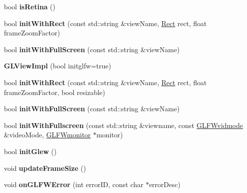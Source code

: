 \begin{DoxyCompactItemize}
\item 
\mbox{\label{classGLViewImpl_aed0c3ba5fb9fbd5c67a2e42cdb828468}} 
bool {\bfseries is\+Retina} ()
\item 
\mbox{\label{classGLViewImpl_ad6cafe42af330824321180c50d5982c1}} 
bool {\bfseries init\+With\+Rect} (const std\+::string \&view\+Name, \hyperlink{classRect}{Rect} rect, float frame\+Zoom\+Factor)
\item 
\mbox{\label{classGLViewImpl_a2815df489e15eeb1e75d96398ff71c9c}} 
bool {\bfseries init\+With\+Full\+Screen} (const std\+::string \&view\+Name)
\item 
\mbox{\label{classGLViewImpl_a992936557b65a1ab4d3b47253ad5253b}} 
{\bfseries G\+L\+View\+Impl} (bool initglfw=true)
\item 
\mbox{\label{classGLViewImpl_ac70725a8b0fca28f099c73326ed6b701}} 
bool {\bfseries init\+With\+Rect} (const std\+::string \&view\+Name, \hyperlink{classRect}{Rect} rect, float frame\+Zoom\+Factor, bool resizable)
\item 
\mbox{\label{classGLViewImpl_a2815df489e15eeb1e75d96398ff71c9c}} 
bool {\bfseries init\+With\+Full\+Screen} (const std\+::string \&view\+Name)
\item 
\mbox{\label{classGLViewImpl_a36797ac9459603a20e54f0aa3b7ae649}} 
bool {\bfseries init\+With\+Fullscreen} (const std\+::string \&viewname, const \hyperlink{structGLFWvidmode}{G\+L\+F\+Wvidmode} \&video\+Mode, \hyperlink{group__monitor_ga8d9efd1cde9426692c73fe40437d0ae3}{G\+L\+F\+Wmonitor} $\ast$monitor)
\item 
\mbox{\label{classGLViewImpl_a67ec065afa82ee548b112e224edeb86d}} 
bool {\bfseries init\+Glew} ()
\item 
\mbox{\label{classGLViewImpl_aad55bf57b544d5ce5ee557820d8d2826}} 
void {\bfseries update\+Frame\+Size} ()
\item 
\mbox{\label{classGLViewImpl_aee71bf18f6c0c51dd1d8f65346df3e0b}} 
void {\bfseries on\+G\+L\+F\+W\+Error} (int error\+ID, const char $\ast$error\+Desc)

\end{DoxyCompactItemize}
